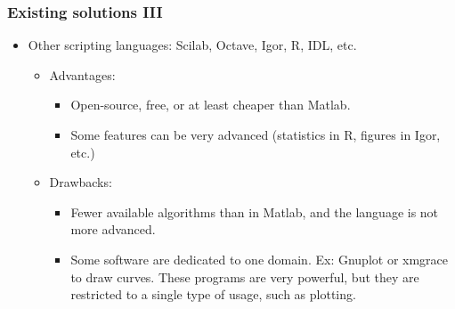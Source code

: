 \documentclass[colorlinks]{beamer}
\begin{document}
\begin{frame}\frametitle{ Existing solutions III}
 \begin{itemize}
    \item Other scripting languages: Scilab, Octave, Igor, R, IDL, etc.
        \begin{itemize}
            \item Advantages:
                \begin{itemize}
                     \item \tiny Open-source, free, or at least cheaper than Matlab.
                    \item \tiny Some features can be very advanced (statistics in R, figures in Igor, etc.)\end{itemize}
            \item Drawbacks:
                \begin{itemize}
                    \item \tiny Fewer available algorithms than in Matlab, and the language is not more advanced.
                    \item \tiny Some software are dedicated to one domain. Ex: Gnuplot or xmgrace to draw curves. These programs are very powerful, but they are restricted to a single type of usage, such as plotting.
                \end{itemize}
        \end{itemize}
\end{itemize}
\end{frame}
\end{document}
